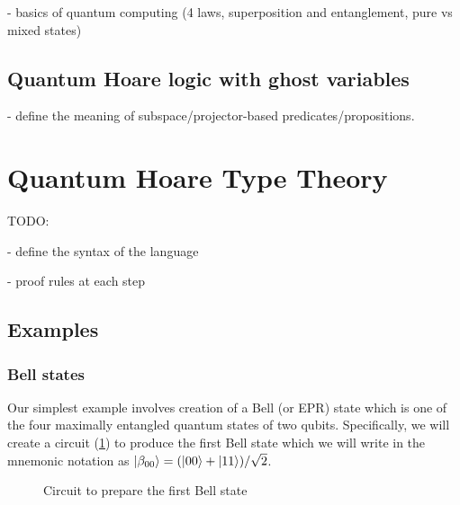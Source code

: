 \documentclass[adraft,creativecommons]{eptcs}
\begin{document}
- basics of quantum computing (4 laws, superposition and entanglement, pure vs mixed states)

\subsection{Quantum Hoare logic with ghost variables}

- define the meaning of subspace/projector-based predicates/propositions.

\section{Quantum Hoare Type Theory}

TODO:

- define the syntax of the language

- proof rules at each step

\subsection{Examples}

\blindtext

\subsubsection{Bell states}

Our simplest example involves creation of a Bell (or EPR) state which is one of the four maximally entangled quantum states of two qubits. Specifically, we will create a circuit (\cref{fig:bell00}) to produce the first Bell state which we will write in the mnemonic notation as $\ket{\beta_{00}} = (\ket{00}+\ket{11})/\sqrt{2}$.

\begin{figure}
    \centering
    \caption{Circuit to prepare the first Bell state}
    \label{fig:bell00}
\end{figure}


\end{document}
